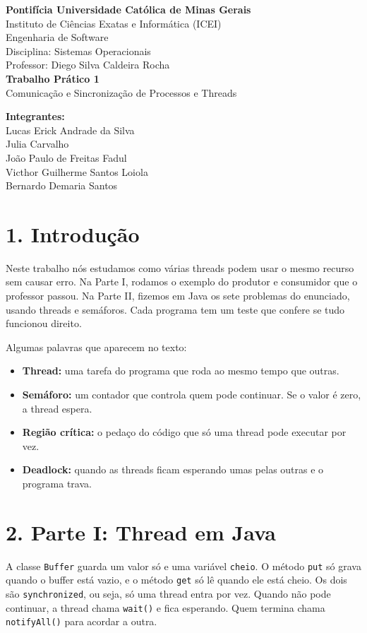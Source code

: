 \documentclass[12pt,a4paper]{article}
\begin{document}
\begin{center}
{\bfseries Pontifícia Universidade Católica de Minas Gerais}\\
Instituto de Ciências Exatas e Informática (ICEI)\\
Engenharia de Software\\
Disciplina: Sistemas Operacionais\\
Professor: Diego Silva Caldeira Rocha\\[12pt]
{\Large\bfseries Trabalho Prático 1}\\
{\large Comunicação e Sincronização de Processos e Threads}\\[12pt]
\end{center}

\textbf{Integrantes:}\\
Lucas Erick Andrade da Silva\\
Julia Carvalho\\
João Paulo de Freitas Fadul\\
Victhor Guilherme Santos Loiola\\
Bernardo Demaria Santos

\section*{1. Introdução}
Neste trabalho nós estudamos como várias threads podem usar o mesmo recurso sem causar erro. Na Parte I, rodamos o
exemplo do produtor e consumidor que o professor passou. Na Parte II, fizemos em Java os sete problemas do
enunciado, usando threads e semáforos. Cada programa tem um teste que confere se tudo funcionou direito.

Algumas palavras que aparecem no texto:
\begin{itemize}
  \item \textbf{Thread:} uma tarefa do programa que roda ao mesmo tempo que outras.
  \item \textbf{Semáforo:} um contador que controla quem pode continuar. Se o valor é zero, a thread espera.
  \item \textbf{Região crítica:} o pedaço do código que só uma thread pode executar por vez.
  \item \textbf{Deadlock:} quando as threads ficam esperando umas pelas outras e o programa trava.
\end{itemize}

\section*{2. Parte I: Thread em Java}
A classe \texttt{Buffer} guarda um valor só e uma variável \texttt{cheio}. O método \texttt{put} só grava quando
o buffer está vazio, e o método \texttt{get} só lê quando ele está cheio. Os dois são \texttt{synchronized}, ou
seja, só uma thread entra por vez. Quando não pode continuar, a thread chama \texttt{wait()} e fica esperando.
Quem termina chama \texttt{notifyAll()} para acordar a outra.
\end{document}
